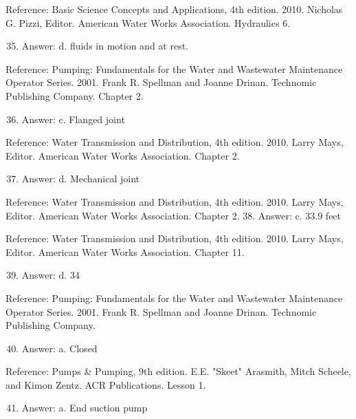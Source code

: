 \documentclass[10pt]{article}
\begin{document}
Reference: Basic Science Concepts and Applications, 4th edition. 2010. Nicholas G. Pizzi, Editor. American Water Works Association. Hydraulics 6.

\begin{enumerate}
  \setcounter{enumi}{34}
  \item Answer: d. fluids in motion and at rest.
\end{enumerate}

Reference: Pumping: Fundamentals for the Water and Wastewater Maintenance Operator Series. 2001. Frank R. Spellman and Joanne Drinan. Technomic Publishing Company. Chapter 2.

\begin{enumerate}
  \setcounter{enumi}{35}
  \item Answer: c. Flanged joint
\end{enumerate}

Reference: Water Transmission and Distribution, 4th edition. 2010. Larry Mays, Editor. American Water Works Association. Chapter 2.

\begin{enumerate}
  \setcounter{enumi}{36}
  \item Answer: d. Mechanical joint
\end{enumerate}

Reference: Water Transmission and Distribution, 4th edition. 2010. Larry Mays, Editor. American Water Works Association. Chapter 2. 38. Answer: c. $33.9$ feet

Reference: Water Transmission and Distribution, 4th edition. 2010. Larry Mays, Editor. American Water Works Association. Chapter 11.

\begin{enumerate}
  \setcounter{enumi}{38}
  \item Answer: d. 34
\end{enumerate}

Reference: Pumping: Fundamentals for the Water and Wastewater Maintenance Operator Series. 2001. Frank R. Spellman and Joanne Drinan. Technomic Publishing Company.

\begin{enumerate}
  \setcounter{enumi}{39}
  \item Answer: a. Closed
\end{enumerate}

Reference: Pumps \& Pumping, 9th edition. E.E. "Skeet" Arasmith, Mitch Scheele, and Kimon Zentz. ACR Publications. Lesson 1.

\begin{enumerate}
  \setcounter{enumi}{40}
  \item Answer: a. End suction pump
\end{enumerate}
\end{document}
